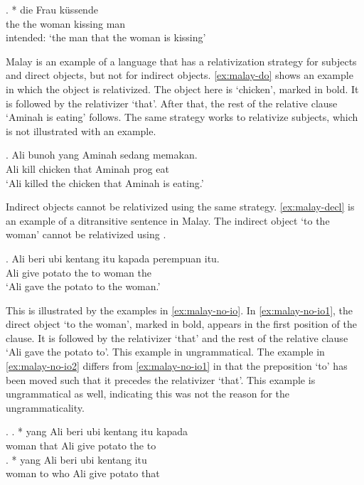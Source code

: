 \exg. * die Frau küssende \\
 the the woman kissing man\\
 intended: `the man that the woman is kissing' \label{ex:german-rel-no-do}

Malay is an example of a language that has a relativization strategy for subjects and direct objects, but not for indirect objects. \ref{ex:malay-do} shows an example in which the object is relativized. The object here is  `chicken', marked in bold. It is followed by the relativizer  `that'. After that, the rest of the relative clause  `Aminah is eating' follows. The same strategy works to relativize subjects, which is not illustrated with an example.

\exg. Ali bunoh  yang Aminah sedang memakan.\\
 Ali kill chicken that Aminah \ac{prog} eat\\
 `Ali killed the chicken that Aminah is eating.' \label{ex:malay-do}

Indirect objects cannot be relativized using the same strategy. \ref{ex:malay-decl} is an example of a ditransitive sentence in Malay. The indirect object  `to the woman' cannot be relativized using .

\exg. Ali beri {ubi kentang} itu kapada perempuan itu.\\
 Ali give potato the to woman the\\
 `Ali gave the potato to the woman.'\label{ex:malay-decl} 

This is illustrated by the examples in \ref{ex:malay-no-io}. In \ref{ex:malay-no-io1}, the direct object  `to the woman', marked in bold, appears in the first position of the clause. It is followed by the relativizer  `that' and the rest of the relative clause  `Ali gave the potato to'. This example in ungrammatical.
The example in \ref{ex:malay-no-io2} differs from \ref{ex:malay-no-io1} in that the preposition  `to' has been moved such that it precedes the relativizer  `that'. This example is ungrammatical as well, indicating this was not the reason for the ungrammaticality.

\ex.\label{ex:malay-no-io}
\ag. * yang Ali beri {ubi kentang} itu kapada\\
 woman that Ali give potato the to\\\label{ex:malay-no-io1}
\bg. *  yang Ali beri {ubi kentang} itu\\
 woman to who Ali give potato that\\\label{ex:malay-no-io2}

